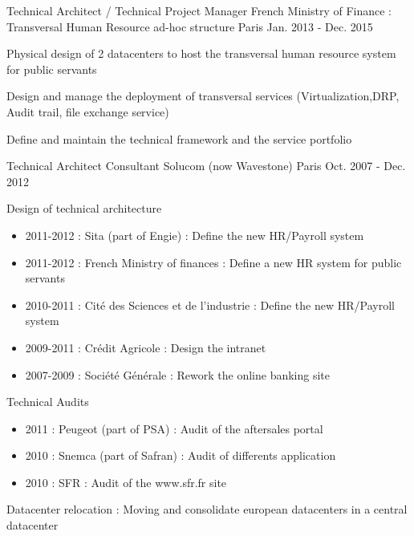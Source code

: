 \documentclass[12pt, a4paper]{awesome-cv}
\begin{document}
\begin{cventries}
   \cventry
    {Technical Architect / Technical Project Manager} 
    {French Ministry of Finance : Transversal Human Resource ad-hoc structure} 
    {Paris} 
    {Jan. 2013 - Dec. 2015} 
    {
      \begin{cvitems} 
        \item {Physical design of 2 datacenters to host the transversal human resource system for public servants}
		\item {Design and manage the deployment of transversal services (Virtualization,DRP, Audit trail, file exchange service)}
		\item {Define and maintain the technical framework and the service portfolio}
		\item {}
      \end{cvitems}
    }

  \cventry
    {Technical Architect Consultant} 
    {Solucom (now Wavestone)} 
    {Paris} 
    {Oct. 2007 - Dec. 2012} 
    {
      \begin{cvitems}
        \item {Design of technical architecture}
		\begin{itemize}
			\item {2011-2012 : Sita (part of Engie) : Define the new HR/Payroll system}
			\item {2011-2012 : French Ministry of finances : Define a new HR system for public servants}
			\item {2010-2011 : Cité des Sciences et de l’industrie : Define the new HR/Payroll system}
			\item {2009-2011 : Crédit Agricole : Design the intranet}
			\item {2007-2009 : Société Générale : Rework the online banking site}
		\end{itemize}
		\item{Technical Audits}
		\begin{itemize}
			\item {2011 : Peugeot (part of PSA) : Audit of the aftersales portal}
			\item {2010 : Snemca (part of Safran) : Audit of differents application}
			\item {2010 : SFR : Audit of the www.sfr.fr site}
		\end{itemize}
		\item {Datacenter relocation : Moving and consolidate european datacenters in a central datacenter}
      \end{cvitems}
    }
\end{cventries}
\end{document}
